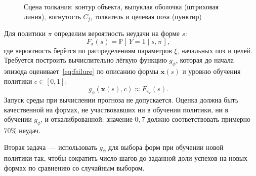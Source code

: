 \documentclass{misisarticle}
\begin{document}
\begin{figure}[htbp]
  \centering
  \caption{Сцена толкания: контур объекта, выпуклая оболочка (штриховая линия), вогнутость $C_j$, толкатель и целевая поза (пунктир)}
  \label{fig:scene}
\end{figure}

Для политики $\pi$ определим вероятность неудачи на форме $s$:
\begin{equation}
  F_\pi(s) = \mathbb{P}\left[\,Y = 1 \mid s, \pi\,\right],
  \label{eq:failure}
\end{equation}
где вероятность берётся по распределениям параметров $\xi$, начальных поз и целей. Требуется построить вычислительно лёгкую функцию $g_\phi$, которая до начала эпизода оценивает~\eqref{eq:failure} по описанию формы $\mathbf{x}(s)$ и уровню обучения политики $c \in [0, 1]$:
\begin{equation}
  g_\phi(\mathbf{x}(s), c) \approx F_{\pi_c}(s).
  \label{eq:target}
\end{equation}
Запуск среды при вычислении прогноза не допускается. Оценка должна быть качественной на формах, не участвовавших ни в обучении политики, ни в обучении $g_\phi$, и откалиброванной: значение $0{,}7$ должно соответствовать примерно 70\% неудач.

Вторая задача~--- использовать $g_\phi$ для выбора форм при обучении новой политики так, чтобы сократить число шагов до заданной доли успехов на новых формах по сравнению со случайным выбором.

\end{document}
